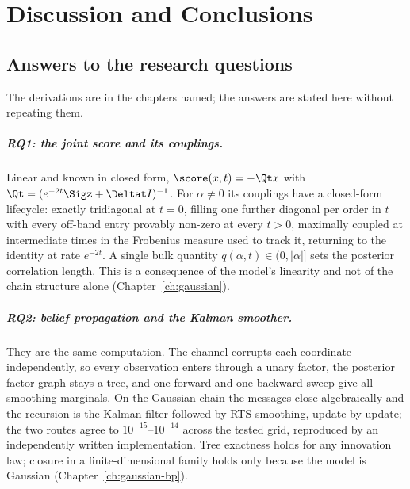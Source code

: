 \chapter{Discussion and Conclusions}\label{ch:conclusions}

\section{Answers to the research questions}\label{sec:conclusions-findings}

The derivations are in the chapters named; the answers are stated here without
repeating them.

\paragraph{RQ1: the joint score and its couplings.} Linear and known in closed
form, $\score(x,t) = -\Qt x$ with $\Qt = (e^{-2t}\Sigz + \Deltat I)^{-1}$. For
$\alpha \neq 0$ its
couplings have a closed-form lifecycle: exactly tridiagonal at $t=0$, filling
one further diagonal per order in $t$ with every off-band entry provably
non-zero at every $t > 0$, maximally coupled at intermediate times in the
Frobenius measure used to track it,
returning to the identity at rate $e^{-2t}$. A single bulk quantity
$q(\alpha,t) \in (0,|\alpha|]$ sets the posterior correlation length. This is a
consequence of the model's linearity and not of the chain structure alone
(Chapter~\ref{ch:gaussian}).

\paragraph{RQ2: belief propagation and the Kalman smoother.} They are the same
computation. The channel corrupts each coordinate independently, so every
observation enters through a unary factor, the posterior factor graph stays a
tree, and one forward and one backward sweep give all smoothing marginals. On
the Gaussian chain the messages close algebraically and the recursion is the
Kalman filter followed by RTS smoothing, update by update; the two routes agree
to $10^{-15}$--$10^{-14}$ across the tested grid, reproduced by an independently
written implementation. Tree exactness holds for any innovation law; closure in
a finite-dimensional family holds only because the model is Gaussian
(Chapter~\ref{ch:gaussian-bp}).

